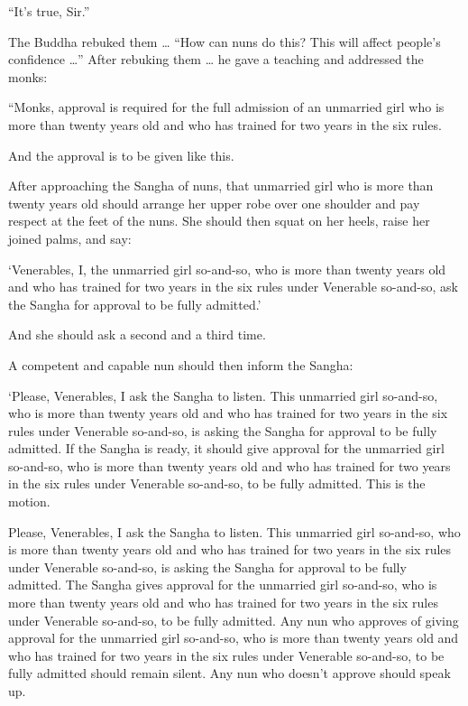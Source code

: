 \documentclass[12pt,openany]{book}%
\begin{document}
“It’s true, Sir.” 

The Buddha rebuked them … “How can nuns do this? This will affect people’s confidence …” After rebuking them … he gave a teaching and addressed the monks: 

“Monks, approval is required for the full admission of an unmarried girl who is more than twenty years old and who has trained for two years in the six rules. 

And the approval is to be given like this. 

After approaching the Sangha of nuns, that unmarried girl who is more than twenty years old should arrange her upper robe over one shoulder and pay respect at the feet of the nuns. She should then squat on her heels, raise her joined palms, and say: 

‘Venerables, I, the unmarried girl so-and-so, who is more than twenty years old and who has trained for two years in the six rules under Venerable so-and-so, ask the Sangha for approval to be fully admitted.’ 

And she should ask a second and a third time. 

A competent and capable nun should then inform the Sangha: 

‘Please, Venerables, I ask the Sangha to listen. This unmarried girl so-and-so, who is more than twenty years old and who has trained for two years in the six rules under Venerable so-and-so, is asking the Sangha for approval to be fully admitted. If the Sangha is ready, it should give approval for the unmarried girl so-and-so, who is more than twenty years old and who has trained for two years in the six rules under Venerable so-and-so, to be fully admitted. This is the motion. 

Please, Venerables, I ask the Sangha to listen. This unmarried girl so-and-so, who is more than twenty years old and who has trained for two years in the six rules under Venerable so-and-so, is asking the Sangha for approval to be fully admitted. The Sangha gives approval for the unmarried girl so-and-so, who is more than twenty years old and who has trained for two years in the six rules under Venerable so-and-so, to be fully admitted. Any nun who approves of giving approval for the unmarried girl so-and-so, who is more than twenty years old and who has trained for two years in the six rules under Venerable so-and-so, to be fully admitted should remain silent. Any nun who doesn’t approve should speak up. 
\end{document}
